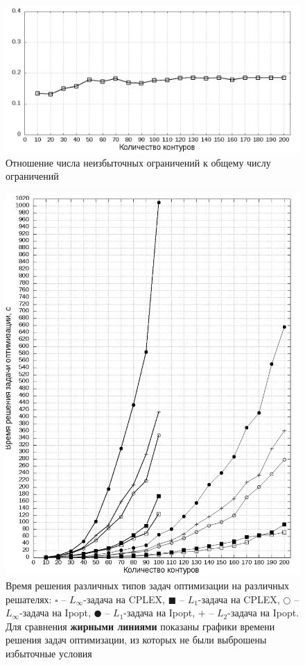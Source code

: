 \documentclass[a4paper, 10pt]{article}
\theoremstyle{definition}
\theoremstyle{plain}
\theoremstyle{plain}
\begin{document}
\begin{figure}[hh]
 \includegraphics[width=\textwidth]{images/Reduced-constraints-ratio-graph}
 \caption{Отношение числа неизбыточных ограничений к общему числу ограничений}
 \label{Reduced-constraints-ratio-graph}
\end{figure}

\begin{figure}[p]
 \includegraphics[width=\textwidth]{images/Problem-solution-time-graphs}
 \captionsetup{singlelinecheck=off}
 \caption{Время решения различных типов задач оптимизации на различных
 решателях:
 $\square$ -- $L_{\infty}$-задача на CPLEX,
 $\blacksquare$ -- $L_{1}$-задача на CPLEX,
 $\Circle$ -- $L_{\infty}$-задача на Ipopt,
 $\CIRCLE$ -- $L_{1}$-задача на Ipopt,
 $+$ -- $L_{2}$-задача на Ipopt. Для сравнения \textbf{жирными линиями} показаны
 графики времени решения задач оптимизации, из которых не были выброшены
 избыточные условия}
 \label{Problem-solution-time-graphs}
\end{figure}
\end{document}
